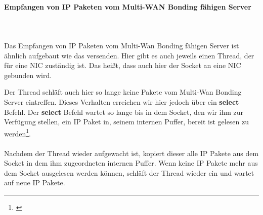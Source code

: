 \paragraph{Empfangen von IP Paketen vom Multi-WAN Bonding fähigen Server}
\ \\\\
Das Empfangen von IP Paketen vom Multi-Wan Bonding fähigen Server ist ähnlich aufgebaut wie das versenden. Hier gibt es auch jeweils einen Thread, der für eine NIC zuständig ist. Das heißt, dass auch hier der Socket an eine NIC gebunden wird.

\newpage

Der Thread schläft auch hier so lange keine Pakete vom Multi-Wan Bonding Server eintreffen. Dieses Verhalten erreichen wir hier jedoch über ein \textbf{select} Befehl. Der \textbf{select} Befehl wartet so lange bis in dem Socket, den wir ihm zur Verfügung stellen, ein IP Paket in, seinem internen Puffer, bereit ist gelesen zu werden\footnote[1]{\cite[Vgl.][]{18}}. 
\\\\
Nachdem der Thread wieder aufgewacht ist, kopiert dieser alle IP Pakete aus dem Socket in dem ihm zugeordneten internen Puffer. Wenn keine IP Pakete mehr aus dem Socket ausgelesen werden können, schläft der Thread wieder ein und wartet auf neue IP Pakete.

